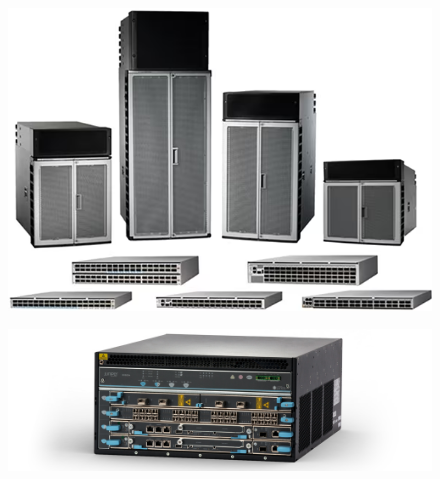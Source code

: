 \begin{figure}[h]
    \centering
    \begin{minipage}{0.45\textwidth}
        \centering
        \begin{adjustbox}{frame, bgcolor=black, center}
            \includegraphics[width=\linewidth]{images/8000_routers.png}
        \end{adjustbox}
        \label{fig:image1}
    \end{minipage}
    \hfill
    \begin{minipage}{0.5\textwidth}
        \centering
        \begin{adjustbox}{frame, bgcolor=black, center}
            \includegraphics[width=\linewidth]{images/juniper_switch.png}
        \end{adjustbox}
        \label{fig:image2}
    \end{minipage}
\end{figure}

